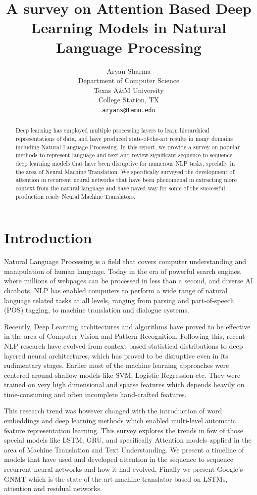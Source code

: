 \documentclass{article}
\title{A survey on Attention Based Deep Learning Models in Natural Language Processing}
\author{
  Aryan Sharma\\
  Department of Computer Science\\
  Texas A\&M University\\
  College Station, TX \\
  \texttt{aryans@tamu.edu}
}
\begin{document}
\maketitle

\begin{abstract}

	Deep learning has employed multiple processing layers to learn hierarchical representations of data, and have produced state-of-the-art results in many domains including Natural Language Processing. In this report, we provide a survey on popular methods to represent language and text and review significant sequence to sequence deep learning models that have been disruptive for numerous NLP tasks, specially in the area of Neural Machine Translation. We specifically surveyed the development of attention in recurrent neural networks that have been phenomenal in extracting more context from the natural language and have paved way for some of the successful production ready Neural Machine Translators.

\end{abstract}


\section{Introduction}

	Natural Language Processing is a field that covers computer understanding and manipulation of human language. Today in the era of powerful search engines, where millions of webpages can be processed in less than a second, and diverse AI chatbots, NLP has enabled computers to perform a wide range of natural language related tasks at all levels, ranging from parsing and part-of-speech (POS) tagging, to machine translation and dialogue systems.
	
	Recently, Deep Learning architectures and algorithms have proved to be effective in the area of Computer Vision and Pattern Recognition. Following this, recent NLP research have evolved from context based statistical distributions to deep layered neural architectures, which has proved to be disruptive even in its rudimentary stages. Earlier most of the machine learning approaches were centered around shallow models like SVM, Logistic Regression etc. They were trained on very high dimensional and sparse features \cite{salton} which depends heavily on time-consuming and often incomplete hand-crafted features. 
	
	This research trend was however changed with the introduction of word embeddings and deep learning methods which enabled multi-level automatic feature representation learning. This survey explores the trends in few of those special models like LSTM, GRU, and specifically Attention models applied in the area of Machine Translation and Text Understanding. We present a timeline of models that have used and developed attention in the sequence to sequence recurrent neural networks and how it had evolved. Finally we present Google's GNMT which is the state of the art machine translator based on LSTMs, attention and residual networks. 
	
\end{document}
